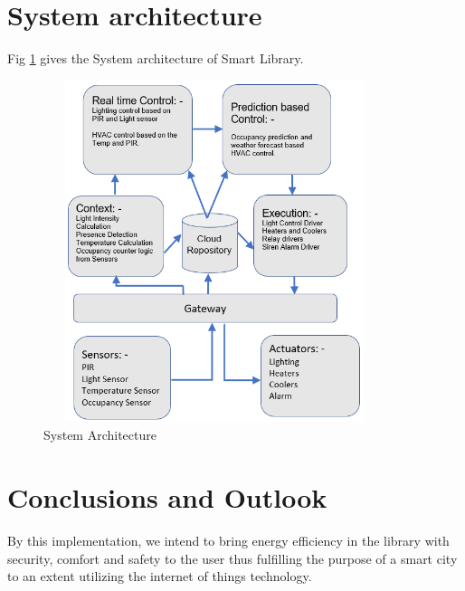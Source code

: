 \documentclass[runningheads]{llncs}
\begin{document}
\section{System architecture}
Fig \ref{fig1} gives the System architecture of Smart Library.
\begin{figure}
\begin{center}
\includegraphics[height=10cm, width=10cm]{fig1}
\caption{System Architecture} \label{fig1}
\end{center}
\end{figure}

\section{Conclusions and Outlook}
By this implementation, we intend to bring energy efficiency in the library with security, comfort and safety to the user thus fulfilling the purpose of a smart city to an extent utilizing the internet of things technology.
\end{document}
